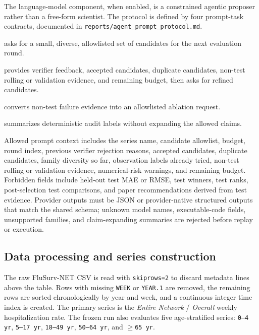 The language-model component, when enabled, is a constrained agentic proposer
rather than a free-form scientist. The protocol is defined by four prompt-task
contracts, documented in \texttt{reports/agent\_prompt\_protocol.md}.
\begin{description}[leftmargin=1.5em]
\item[Task A: Initial candidate proposal] asks for a small, diverse,
allowlisted set of candidates for the next evaluation round.
\item[Task B: Evidence-aware refinement] provides verifier feedback,
accepted candidates, duplicate candidates, non-test rolling or validation
evidence, and remaining budget, then asks for refined candidates.
\item[Task C: Failure diagnosis or ablation request] converts non-test
failure evidence into an allowlisted ablation request.
\item[Task D: Claim-boundary summary] summarizes deterministic audit labels
without expanding the allowed claims.
\end{description}

Allowed prompt context includes the series name, candidate allowlist, budget,
round index, previous verifier rejection reasons, accepted candidates,
duplicate candidates, family diversity so far, observation labels already
tried, non-test rolling or validation evidence, numerical-risk warnings, and
remaining budget. Forbidden fields include held-out test MAE or RMSE, test
winners, test ranks, post-selection test comparisons, and paper
recommendations derived from test evidence. Provider outputs must be JSON or
provider-native structured outputs that match the shared schema; unknown model
names, executable-code fields, unsupported families, and claim-expanding
summaries are rejected before replay or execution.

\subsection{Data processing and series construction}

The raw FluSurv-NET CSV is read with \texttt{skiprows=2} to discard metadata
lines above the table. Rows with missing \texttt{WEEK} or \texttt{YEAR.1} are
removed, the remaining rows are sorted chronologically by year and week, and a
continuous integer time index is created. The primary series is the
\emph{Entire Network} / \emph{Overall} weekly hospitalization rate. The frozen
run also evaluates five age-stratified series:
\texttt{0--4 yr}, \texttt{5--17 yr}, \texttt{18--49 yr},
\texttt{50--64 yr}, and \texttt{$\geq$65 yr}.

